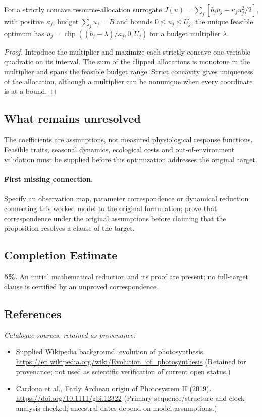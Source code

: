 \documentclass[11pt]{article}
\begin{document}
\begin{proposition}
For a strictly concave resource-allocation surrogate $J(u)=\sum_j[b_ju_j-\kappa_j u_j^2/2]$, with positive $\kappa_j$, budget $\sum_ju_j=B$ and bounds $0\leq u_j\leq U_j$, the unique feasible optimum has $u_j=\operatorname{clip}((b_j-\lambda)/\kappa_j,0,U_j)$ for a budget multiplier $\lambda$.
\end{proposition}
\begin{proof}
Introduce the multiplier and maximize each strictly concave one-variable quadratic on its interval. The sum of the clipped allocations is monotone in the multiplier and spans the feasible budget range. Strict concavity gives uniqueness of the allocation, although a multiplier can be nonunique when every coordinate is at a bound.
\end{proof}
\subsection{What remains unresolved}
The coefficients are assumptions, not measured physiological response functions. Feasible traits, seasonal dynamics, ecological costs and out-of-environment validation must be supplied before this optimization addresses the original target.
\paragraph{First missing connection.} Specify an observation map, parameter correspondence or dynamical reduction connecting this worked model to the original formulation; prove that correspondence under the original assumptions before claiming that the proposition resolves a clause of the target.
\subsection{Completion Estimate}
\textbf{5\%.} An initial mathematical reduction and its proof are present; no full-target clause is certified by an unproved correspondence.
\subsection{References}
\noindent\emph{Catalogue sources, retained as provenance:}
\begin{itemize}
\item Supplied Wikipedia background: evolution of photosynthesis. \url{https://en.wikipedia.org/wiki/Evolution_of_photosynthesis} (Retained for provenance; not used as scientific verification of current open status.)
\item Cardona et al., Early Archean origin of Photosystem II (2019). \url{https://doi.org/10.1111/gbi.12322} (Primary sequence/structure and clock analysis checked; ancestral dates depend on model assumptions.)
\end{itemize}
\end{document}
